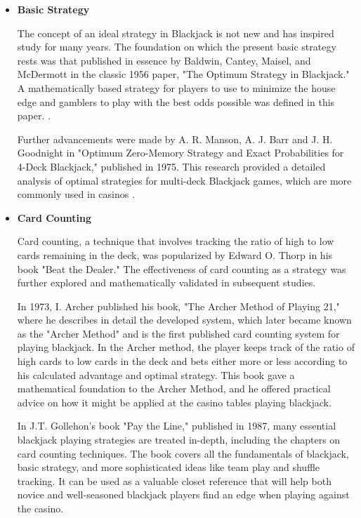 \documentclass[a4paper,12pt]{report}
\begin{document}
\begin{itemize}
\item {\textbf{Basic Strategy}}

The concept of an ideal strategy in Blackjack is not new and has inspired study for many years. The foundation on which the present basic strategy rests was that published in essence by Baldwin, Cantey, Maisel, and McDermott in the classic 1956 paper, "The Optimum Strategy in Blackjack." A mathematically based strategy for players to use to minimize the house edge and gamblers to play with the best odds possible was defined in this paper. \cite{paper:2}.

Further advancements were made by A. R. Manson, A. J. Barr and J. H. Goodnight in "Optimum Zero-Memory Strategy and Exact Probabilities for 4-Deck Blackjack," published in 1975. This research provided a detailed analysis of optimal strategies for multi-deck Blackjack games, which are more commonly used in casinos \cite{paper:3}.

\item {\textbf{Card Counting}}

Card counting, a technique that involves tracking the ratio of high to low cards remaining in the deck, was popularized by Edward O. Thorp in his book "Beat the Dealer."\cite{book:1} The effectiveness of card counting as a strategy was further explored and mathematically validated in subsequent studies.

In 1973, I. Archer published his book, "The Archer Method of Playing 21,"\cite{book:2} where he describes in detail the developed system, which later became known as the "Archer Method" and is the first published card counting system for playing blackjack. In the Archer method, the player keeps track of the ratio of high cards to low cards in the deck and bets either more or less according to his calculated advantage and optimal strategy. This book gave a mathematical foundation to the Archer Method, and he offered practical advice on how it might be applied at the casino tables playing blackjack.

In J.T. Gollehon's book "Pay the Line,"\cite{book:3} published in 1987, many essential blackjack playing strategies are treated in-depth, including the chapters on card counting techniques. The book covers all the fundamentals of blackjack, basic strategy, and more sophisticated ideas like team play and shuffle tracking. It can be used as a valuable closet reference that will help both novice and well-seasoned blackjack players find an edge when playing against the casino.


\end{itemize}
\end{document}
